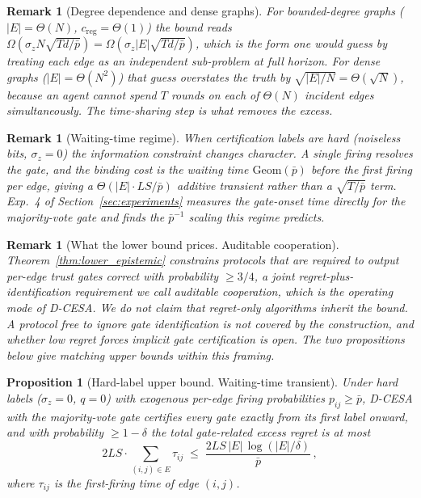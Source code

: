 \documentclass[11pt]{article}
\newtheorem{proposition}[theorem]{Proposition}
\newtheorem{remark}[theorem]{Remark}
\begin{document}
\begin{remark}[Degree dependence and dense graphs]\label{rem:epi_tight}
For bounded-degree graphs ($|E|=\Theta(N)$,
$c_{\mathrm{reg}}=\Theta(1)$) the bound reads
$\Omega(\sigma_z N\sqrt{Td/\bar p})
=\Omega(\sigma_z|E|\sqrt{Td/\bar p})$, which is the form one would
guess by treating each edge as an independent sub-problem at full
horizon.  For dense graphs ($|E|=\Theta(N^2)$) that guess overstates
the truth by $\sqrt{|E|/N}=\Theta(\sqrt N)$, because an agent cannot
spend $T$ rounds on each of $\Theta(N)$ incident edges
simultaneously. The time-sharing step is what removes the excess.
\end{remark}

\begin{remark}[Waiting-time regime]\label{rem:epi_downgrade}
When certification labels are \emph{hard} (noiseless bits,
$\sigma_z=0$) the information constraint changes character. A single
firing resolves the gate, and the binding cost is the waiting time
$\mathrm{Geom}(\bar p)$ before the first firing per edge, giving a
$\Theta(|E|\cdot L S/\bar p)$ additive transient rather than a
$\sqrt{T/\bar p}$ term.  Exp.~4 of Section~\ref{sec:experiments}
measures the gate-onset time directly for the majority-vote gate and
finds the $\bar p^{-1}$ scaling this regime predicts.
\end{remark}

\begin{remark}[What the lower bound prices. Auditable cooperation]
\label{rem:epi_framing}
Theorem~\ref{thm:lower_epistemic} constrains protocols that are
\emph{required} to output per-edge trust gates correct with
probability $\geq3/4$, a joint regret-plus-identification
requirement we call \emph{auditable} cooperation, which is the
operating mode of D-CESA.  We do \emph{not} claim that regret-only
algorithms inherit the bound. A protocol free to ignore gate
identification is not covered by the construction, and whether low
regret forces implicit gate certification is open.  The two
propositions below give matching upper bounds within this framing.
\end{remark}

\begin{proposition}[Hard-label upper bound. Waiting-time transient]
\label{prop:epi_upper_hard}
Under hard labels ($\sigma_z=0$, $q=0$) with exogenous per-edge firing
probabilities $p_{ij}\geq\bar p$, D-CESA with the majority-vote gate
certifies every gate exactly from its first label onward, and with
probability $\geq1-\delta$ the total gate-related excess regret is at
most
\[
2LS\cdot\sum_{(i,j)\in E}\tau_{ij}
\;\leq\;\frac{2LS\,|E|\,\log(|E|/\delta)}{\bar p}\,,
\]
where $\tau_{ij}$ is the first-firing time of edge $(i,j)$.
\end{proposition}
\end{document}
